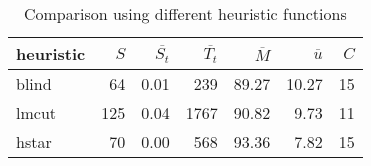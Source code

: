 \begin{table}[htbp]
\centering
\begingroup\small
\begin{tabular}{lrrrrrr}
  \hline
heuristic & $S$ & $\overline{S_t}$ & $\overline{T_t}$ & $\overline{M}$ & $\overline{u}$ & $C$ \\ 
  \hline
blind &  64 & 0.01 & 239 & 89.27 & 10.27 &  15 \\ 
  lmcut & 125 & 0.04 & 1767 & 90.82 & 9.73 &  11 \\ 
  hstar &  70 & 0.00 & 568 & 93.36 & 7.82 &  15 \\ 
   \hline
\end{tabular}
\endgroup
\caption{Comparison using different heuristic functions} 
\label{tab:summary_heuristics}
\end{table}
